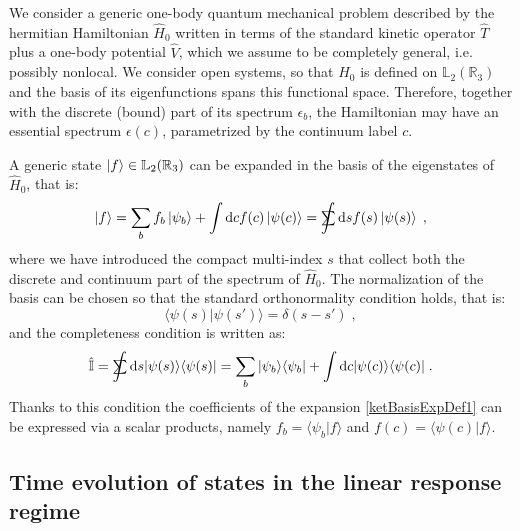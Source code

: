 \documentclass[a4paper]{article}
\newcommand{\dd}{{\rm d}}
\newcommand{\eps}{\epsilon}
\newcommand{\sint}{\mathrlap{\displaystyle\int}
\mathrlap{\textstyle\sum}
\phantom{\mathrlap{\displaystyle
\int}\textstyle\sum}}
\newcommand{\be}{\begin{equation}}
\newcommand{\ee}{\end{equation}}
\newcommand{\lb}{\label}
\newcommand{\op}[1]{\hat {#1}}
\newcommand{\brket}[2]{\langle  #1 | #2 \rangle} %
\newcommand{\ketbra}[2]{| #1 \rangle \langle #2 |}
\newcommand{\hnot}{\op{H}_0}
\newcommand{\identity}{\op{\mathbb I}}
\begin{document}
We consider a generic one-body quantum mechanical problem described by the hermitian Hamiltonian $\hnot$  written in terms of the standard 
kinetic operator $\op T$ plus a one-body potential $\op V$, which we assume to be completely general, i.e. possibly nonlocal.
We consider open systems, so that $\hnot$ is defined on $\mathbb L_2(\mathbb R_3)$ and the basis of its eigenfunctions spans this 
functional space. Therefore, together with the discrete (bound) part of its spectrum $\eps_b$, the Hamiltonian may have an essential spectrum 
$\eps(c)$, parametrized by the continuum label $c$. 

A generic state $\ket{f} \in \mathbb L_2(\mathbb R_3)$ can be expanded in the basis of the eigenstates of $\hnot$, that is:
\be\lb{ketBasisExpDef1}
\ket{f} = \sum_b f_b \ket{\psi_b} + \int \dd c f(c) \ket{\psi(c)}  = 
\sint \dd s f(s) \ket{\psi(s)} \;,
\ee
where we have introduced the compact multi-index $s$ that collect both the discrete and continuum part of the spectrum of $\hnot$.
The normalization of the basis can be chosen so that the standard orthonormality condition holds, that is: 
\be
\brket{\psi(s)}{\psi(s')} = \delta(s-s') \;,
\ee
and the completeness condition is written as:
\be\lb{completenessH0basis1}
\identity = \sint \dd s \ketbra{\psi(s)}{\psi(s)} = \sum_{b} \ketbra{\psi_b}{\psi_b} + \int \dd c \ketbra{\psi(c)}{\psi(c)} \;. 
\ee
Thanks to this condition the coefficients of the expansion \eqref{ketBasisExpDef1} can be expressed via a scalar products, namely $f_{b} = 
\brket{\psi_b}{f}$ and $f(c) = \brket{\psi(c)}{f}$.

\subsection{Time evolution of states in the linear response regime}
\end{document}
